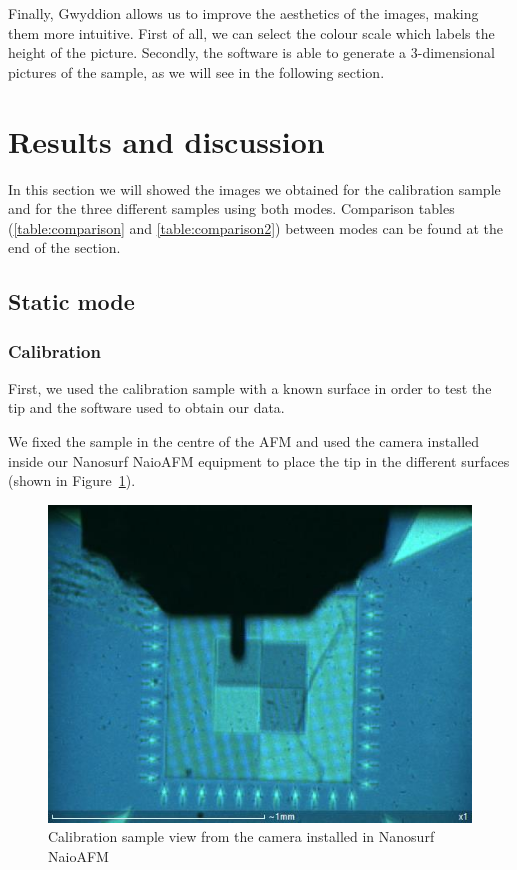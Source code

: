 \documentclass[11pt,a4paper]{article}
\begin{document}
Finally, Gwyddion allows us to improve the aesthetics of the images, making them more intuitive. First of all, we can select the colour scale which labels the height of the picture. Secondly, the software is able to generate a 3-dimensional pictures of the sample, as we will see in the following section.

\newpage
\section{Results and discussion}
In this section we will showed the images we obtained for the calibration sample and for the three different samples using both modes. Comparison tables (\ref{table:comparison} and \ref{table:comparison2}) between modes can be found at the end of the section.

\subsection{Static mode}
\subsubsection{Calibration}
First, we used the calibration sample with a known surface in order to test the tip and the software used to obtain our data. 

We fixed the sample in the centre of the AFM and used the camera installed inside our Nanosurf NaioAFM equipment to place the tip in the different surfaces (shown in Figure~\ref{fig:cal_sam}).

\begin{figure}[H]
\centering
\includegraphics[scale=0.4]{calibration_sample}
\caption{Calibration sample view from the camera installed in Nanosurf NaioAFM}
\label{fig:cal_sam}
\end{figure}
\end{document}
